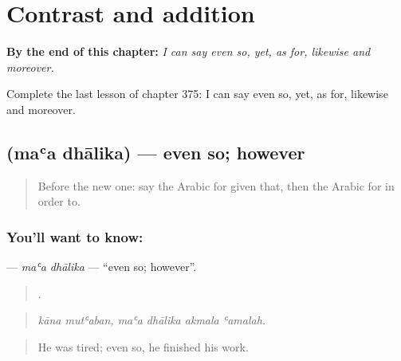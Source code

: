 
\chapter{Contrast and addition}
\label{ch:ar-contrast-and-addition}

\begin{chapteropening}
\textbf{By the end of this chapter:} \emph{I can say even so, yet, as for, likewise and moreover.}

Complete the last lesson of chapter 375: I can say even so, yet, as for, likewise and moreover.
\end{chapteropening}

\section[\texorpdfstring{\ar{مع} \ar{ذلك} (maʿa dhālika)}{مع ذلك (maʿa dhālika)}]{  (maʿa dhālika) — even so; however}

\label{lesson:AR-C375-maa-dhalika}



\begin{quote}
Before the new one: say the Arabic for given that, then the Arabic for in order to.
\end{quote}

\subsection*{You'll want to know:  }
\textbf{ } — \emph{maʿa dhālika} — \textquotedblleft{}even so; however\textquotedblright{}.

\begin{quote}
     .
\end{quote}

\begin{quote}
\emph{kāna mutʿaban, maʿa dhālika akmala ʿamalah.}
\end{quote}

\begin{quote}
He was tired; even so, he finished his work.
\end{quote}

